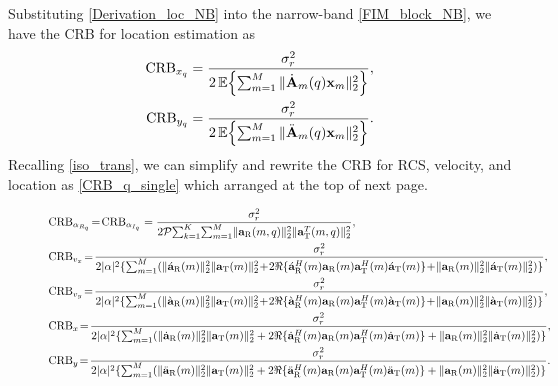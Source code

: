 \documentclass[9pt,final,journal,twocolumn]{IEEEtran}
\begin{document}
Substituting \eqref{Derivation_loc_NB} into the narrow-band \eqref{FIM_block_NB}, we have the CRB for location estimation as
\begin{subequations}\label{CRB_loc_q_NB}
\begin{align}
 \mathrm{CRB}_{x_q}
 &=\frac{\sigma_r^2}{2\,\mathbb{E}\!\left\{\sum_{m=1}^{M}\|\dot{\bf A}_{m}(q){\bf x}_{m}\|_2^2\right\}},\\
 \mathrm{CRB}_{y_q}
 &=\frac{\sigma_r^2}{2\,\mathbb{E}\!\left\{\sum_{m=1}^{M}\|\ddot{\bf A}_{m}(q){\bf x}_{m}\|_2^2\right\}}.
\end{align}
\end{subequations}
Recalling \eqref{iso_trans}, we can simplify and rewrite the CRB for RCS, velocity, and location as \eqref{CRB_q_single} which arranged at the top of next page. 
\begin{figure}[!t]
\begin{small}
\begin{subequations} \label{CRB_q_single}
\begin{flalign}
&\mathrm{CRB}_{\alpha_{R_{q}}} \!=\!\mathrm{CRB}_{\alpha_{I_{q}}} =\frac{\sigma_r^2}{2\mathcal{P}{\sum}_{k=1}^K{\sum}_{m=1}^M\|{\bf a}_{\mathrm{R}}(m,q)\|_2^2\|{\bf a}_{\mathrm{T}}^{T}(m,q)\|_2^2},\\
 &\mathrm{CRB}_{v_{x}} \!=\!\frac{\sigma_r^2}{2|\alpha|^2\{\sum_{m=1}^M    (\|\acute{\bf a}_{\mathrm R}(m)\|_2^2\|{\bf a}_{\mathrm T}(m)\|_2^2\!+\!2\Re{\{\acute{\bf a}_{\mathrm R}^H(m){\bf a}_{\mathrm R}(m)}{\bf a}_{\mathrm T}^H(m)\acute{\bf a}_{\mathrm T}(m)\}\!+\!\|{\bf a}_{\mathrm R}(m)\|_2^2\|\acute{\bf a}_{\mathrm T}(m)\|_2^2) \}},     \label{CRB_vel.q1_single}\\
 &\mathrm{CRB}_{v_{y}}  \!=\!\frac{\sigma_r^2}{2|\alpha|^2\{\sum_{m=1}^M    (\|\grave{\bf a}_{\mathrm R}(m)\|_2^2\|{\bf a}_{\mathrm T}(m)\|_2^2\!+\!2\Re{\{\grave{\bf a}_{\mathrm R}^H(m){\bf a}_{\mathrm R}(m)}{\bf a}_{\mathrm T}^H(m)\grave{\bf a}_{\mathrm T}(m)\}\!+\!\|{\bf a}_{\mathrm R}(m)\|_2^2\|\grave{\bf a}_{\mathrm T}(m)\|_2^2) \}}, \label{CRB_vel.q2_single} \\
 &\mathrm{CRB}_{x} \!=\! \frac{\sigma_r^2}{2|\alpha|^2\{\sum_{m=1}^M    (\|\dot{\bf a}_{\mathrm R}(m)\|_2^2\|{\bf a}_{\mathrm T}(m)\|_2^2+2\Re{\{\dot{\bf a}_{\mathrm R}^H(m){\bf a}_{\mathrm R}(m)}{\bf a}_{\mathrm T}^H(m)\dot{\bf a}_{\mathrm T}(m)\}+\|{\bf a}_{\mathrm R}(m)\|_2^2\|\dot{\bf a}_{\mathrm T}(m)\|_2^2) \}},     \label{CRB_loc.q1_single}\\
 &\mathrm{CRB}_{y} \!=\!\frac{\sigma_r^2}{2|\alpha|^2\{\sum_{m=1}^M    (\|\ddot{\bf a}_{\mathrm R}(m)\|_2^2\|{\bf a}_{\mathrm T}(m)\|_2^2+2\Re{\{\ddot{\bf a}_{\mathrm R}^H(m){\bf a}_{\mathrm R}(m)}{\bf a}_{\mathrm T}^H(m)\ddot{\bf a}_{\mathrm T}(m)\}+\|{\bf a}_{\mathrm R}(m)\|_2^2\|\ddot{\bf a}_{\mathrm T}(m)\|_2^2) \}}. \label{CRB_loc.q2_single}
\end{flalign}
\end{subequations}
\end{small}
\hrulefill
\end{figure}
\end{document}
